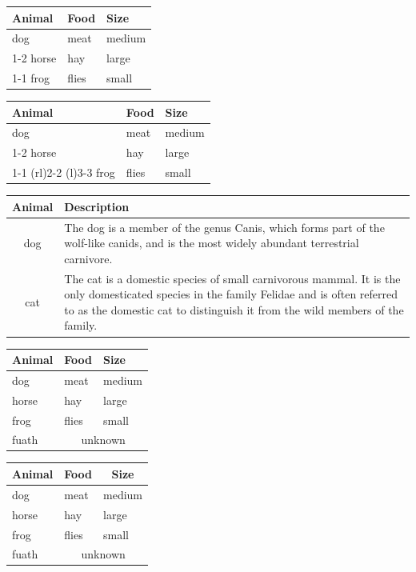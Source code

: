 \documentclass{article}
\begin{document}
\begin{tabular}{lll}
\toprule
Animal & Food & Size \\
\midrule
dog & meat & medium \\
\cmidrule{1-2}
horse & hay & large \\
\cmidrule{1-1}
\cmidrule{3-3}
frog & flies & small \\
\bottomrule
\end{tabular}

\begin{tabular}{lll}
\toprule
Animal & Food & Size \\
\midrule
dog & meat & medium \\
\cmidrule{1-2}
horse & hay & large \\
\cmidrule(r){1-1}
\cmidrule(rl){2-2}
\cmidrule(l){3-3}
frog & flies & small \\
\bottomrule
\end{tabular}

\begin{tabular}{cp{9cm}}
\toprule
Animal & Description \\
\midrule
dog & The dog is a member of the genus Canis, which forms
part of the wolf-like canids, and is the most widely abundant
terrestrial carnivore. \\
\addlinespace
cat & The cat is a domestic species of small carnivorous
mammal. It is the only domesticated species in the family Felidae and
is often referred to as the domestic cat to distinguish it from the
wild members of the family. \\
\bottomrule
\end{tabular}

\begin{tabular}{lll}
\toprule
Animal & Food & Size \\
\midrule
dog & meat & medium \\
horse & hay & large \\
frog & flies & small \\
fuath & \multicolumn{2}{c}{unknown} \\
\bottomrule
\end{tabular}

\begin{tabular}{lll}
\toprule
\multicolumn{1}{c}{Animal} & \multicolumn{1}{c}{Food} &
\multicolumn{1}{c}{Size} \\
\midrule
dog & meat & medium \\
horse & hay & large \\
frog & flies & small \\
fuath & \multicolumn{2}{c}{unknown} \\
\bottomrule
\end{tabular}
\end{document}
